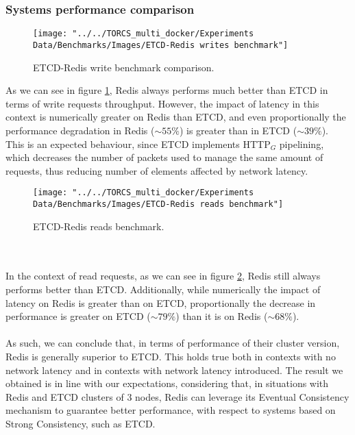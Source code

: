 \subsubsection{Systems performance comparison}
\begin{figure}[h!]
	\centering
	\texttt{[image: "../../TORCS\_multi\_docker/Experiments Data/Benchmarks/Images/ETCD-Redis writes benchmark"]}
	\caption[ETCD-Redis write benchmark comparison]{ETCD-Redis write benchmark comparison.}
	\label{fig:etcd-redis-writes-benchmark}
\end{figure}
As we can see in figure \ref{fig:etcd-redis-writes-benchmark}, Redis always performs much better than ETCD in terms of write requests throughput. However, the impact of latency in this context is numerically greater on Redis than ETCD, and even proportionally the performance degradation in Redis ($\sim{}55\%$) is greater than in ETCD ($\sim{}39\%$). \\
This is an expected behaviour, since ETCD implements HTTP$_G$ pipelining, which decreases the number of packets used to manage the same amount of requests, thus reducing number of elements affected by network latency.
\begin{figure}
	\centering
	\texttt{[image: "../../TORCS\_multi\_docker/Experiments Data/Benchmarks/Images/ETCD-Redis reads benchmark"]}
	\caption[ETCD-Redis reads benchmark]{ETCD-Redis reads benchmark.}
	\label{fig:etcd-redis-reads-benchmark}
\end{figure}
\\ \\ In the context of read requests, as we can see in figure \ref{fig:etcd-redis-reads-benchmark}, Redis still always performs better than ETCD. Additionally, while numerically the impact of latency on Redis is greater than on ETCD, proportionally the decrease in performance is greater on ETCD ($\sim{}79\%$) than it is on Redis ($\sim{}68\%$). \\ \\
As such, we can conclude that, in terms of performance of their cluster version, Redis is generally superior to ETCD. This holds true both in contexts with no network latency and in contexts with network latency introduced. The result we obtained is in line with our expectations, considering that, in situations with Redis and ETCD clusters of 3 nodes, Redis can leverage its Eventual Consistency mechanism to guarantee better performance, with respect to systems based on Strong Consistency, such as ETCD.

